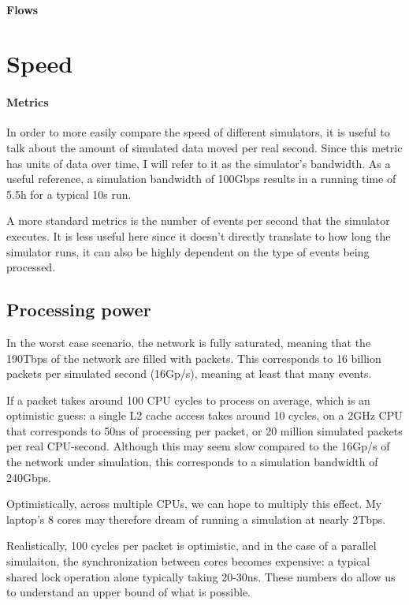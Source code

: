 \paragraph{Flows}


\section{Speed} \label{limits-speed}

\paragraph{Metrics}
In order to more easily compare the speed of different simulators, it is useful to talk about the amount of simulated data moved per real second.
Since this metric has units of data over time, I will refer to it as the simulator's bandwidth.
As a useful reference, a simulation bandwidth of 100Gbps results in a running time of 5.5h for a typical 10s run.

A more standard metrics is the number of events per second that the simulator executes.
It is less useful here since it doesn't directly translate to how long the simulator runs, it can also be highly dependent on the type of events being processed.


\subsection{Processing power} \label{limits-cpu}

In the worst case scenario, the network is fully saturated, meaning that the 190Tbps of the network are filled with packets.
This corresponds to 16 billion packets per simulated second (16Gp/s), meaning at least that many events.

If a packet takes around 100 CPU cycles to process on average, which is an optimistic guess: a single L2 cache access takes around 10 cycles, on a 2GHz CPU that corresponds to 50ns of processing per packet, or 20 million simulated packets per real CPU-second. %
Although this may seem slow compared to the 16Gp/s of the network under simulation, this corresponds to a simulation bandwidth of 240Gbps.

Optimistically, across multiple CPUs, we can hope to multiply this effect.
My laptop's 8 cores may therefore dream of running a simulation at nearly 2Tbps.

Realistically, 100 cycles per packet is optimistic, and in the case of a parallel simulaiton, the synchronization between cores becomes expensive: a typical shared lock operation alone typically taking 20-30ns. %
These numbers do allow us to understand an upper bound of what is possible.



